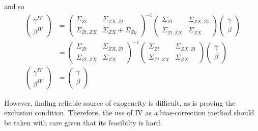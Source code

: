 \documentclass[10pt]{article}
\begin{document}
        and so
        \begin{align}
            \left(\begin{array}{l}
        {\gamma}^{IV} \\
        {\beta}^{IV}
        \end{array}\right)
        & =\left(\begin{array}{cc}
        {\Sigma}_{Zt} & \Sigma_{ZX,Zt} \\
        \Sigma_{Zt,ZX}& {\Sigma}_{ZX}+{\Sigma}_{Z\eta}
        \end{array}\right)^{-1}\left(\begin{array}{cc}
        {\Sigma}_{Zt} & \Sigma_{ZX,Zt} \\
        \Sigma_{Zt,ZX} & {\Sigma}_{ZX}
        \end{array}\right)\left(\begin{array}{l}
        {\gamma} \\
        {\beta}
        \end{array}\right)\\
        & =\left(\begin{array}{cc}
        {\Sigma}_{Zt} & \Sigma_{ZX,Zt} \\
        \Sigma_{Zt,ZX}& {\Sigma}_{ZX}
        \end{array}\right)^{-1}\left(\begin{array}{cc}
        {\Sigma}_{Zt} & \Sigma_{ZX,Zt} \\
        \Sigma_{Zt,ZX} & {\Sigma}_{ZX}
        \end{array}\right)\left(\begin{array}{l}
        {\gamma} \\
        {\beta}
        \end{array}\right) \\
        \left(\begin{array}{l}
        {\gamma}^{IV} \\
        {\beta}^{IV}
        \end{array}\right)
        & =\left(\begin{array}{l}
        {\gamma} \\
        {\beta}
        \end{array}\right)
        \end{align}
        
        However, finding reliable source of exogeneity is difficult, as is proving the exclusion condition. Therefore, the use of IV as a bias-correction method should be taken with care given that its feasibilty is hard.\\
        
\end{document}
